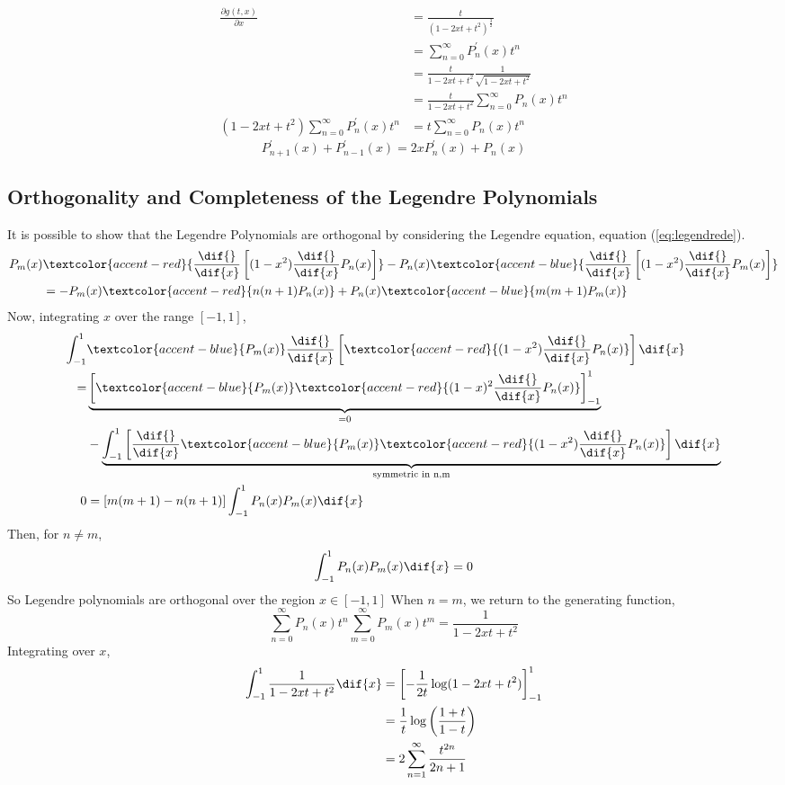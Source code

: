 \begin{align*}
  \frac{\partial g(t,x)}{\partial x} &= \frac{t}{(1-2xt +t^2)^{\frac{3}{2}}} \\
  &= \sum_{n=0}^{\infty} P^{\prime}_n(x)t^n \\
  &= \frac{t}{1-2xt+t^2} \frac{1}{\sqrt{1-2xt+t^2}} \\
  &= \frac{t}{1-2xt+t^2} \sum_{n=0}^{\infty} P_n(x) t^n \\
  (1-2xt+t^2) \sum_{n=0}^{\infty} P^{\prime}_n(x)t^n &= t
  \sum_{n=0}^{\infty} P_n(x) t^n
\end{align*}
\[ P^{\prime}_{n+1}(x) + P^{\prime}_{n-1}(x) = 2x P_n^{\prime}(x) +
P_n(x) \]

\subsection{Orthogonality and Completeness of the Legendre
  Polynomials}
\label{sec:orthogonallegendre}

It is possible to show that the Legendre Polynomials are orthogonal by
considering the Legendre equation, equation (\ref{eq:legendrede}).
\begin{align*}
  P_m(x) & \textcolor{accent-red}{\frac{\dif{}}{\dif{x}} \left[ (1-x^2) \frac{\dif{}}{\dif{x}}P_n(x)\right]} - P_n(x) \textcolor{accent-blue}{\frac{\dif{}}{\dif{x}}\left[ (1-x^2) \frac{\dif{}}{\dif{x}}P_m(x) \right]} \\
  &= - P_m(x) \textcolor{accent-red}{n(n+1)P_n(x)}+P_n(x)
  \textcolor{accent-blue}{m(m+1)P_m(x)}
\end{align*}
Now, integrating $x$ over the range $[-1, 1]$,
\begin{align*}
  \int_{-1}^1& \textcolor{accent-blue}{P_m(x)} \frac{\dif{}}{\dif{x}}
  \left[ \textcolor{accent-red}{(1-x^2) \frac{\dif{}}{\dif{x}} P_n(x)}
  \right] \dif{x} \\= & \underbrace{\left[
      \textcolor{accent-blue}{P_m(x)} \textcolor{accent-red}{(1-x)^2
        \frac{\dif{}}{\dif{x}}P_n(x)} \right]^1_{-1}}_{= 0} \\ &-
  \underbrace{\int_{-1}^1 \left[ \frac{\dif{}}{\dif{x}}
      \textcolor{accent-blue}{P_m(x)}\textcolor{accent-red}{(1-x^2)
        \frac{\dif{}}{\dif{x}} P_n(x)} \right]
    \dif{x}}_{\text{symmetric in n,m}} \\0 & = [m(m+1) - n(n+1)]
  \int_{-1}^1 P_n(x) P_m(x) \dif{x}
\end{align*}
Then, for $n \neq m$,
\[ \int_{-1}^1 P_n(x) P_m(x) \dif{x} = 0 \] So Legendre polynomials
are orthogonal over the region $x \in [-1, 1]$ When $n=m$, we return
to the generating function,
\[ \sum_{n=0}^{\infty} P_n(x)t^n \sum_{m=0}^{\infty} P_m(x)t^m =
\frac{1}{1-2xt+t^2} \] Integrating over $x$,
\begin{align*}
  \int_{-1}^1 \frac{1}{1-2xt+t^2} \dif{x} &= \left[ - \frac{1}{2t}
    \log (1-2xt+t^2) \right]^1_{-1} \\ &= \frac{1}{t} \log \left(
    \frac{1+t}{1-t} \right) \\ &= 2 \sum_{n=1}^{\infty}
  \frac{t^{2n}}{2n+1}
\end{align*}


